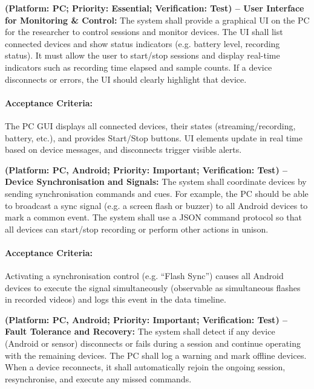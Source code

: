 \begin{description}[style=unboxed,leftmargin=0cm]
	\item[\textbf{FR6}] \textbf{(Platform: PC; Priority: Essential; Verification: Test) – User Interface for Monitoring \& Control:} The system shall provide a graphical UI on the PC for the researcher to control sessions and monitor devices. The UI shall list connected devices and show status indicators (e.g. battery level, recording status). It must allow the user to start/stop sessions and display real-time indicators such as recording time elapsed and sample counts. If a device disconnects or errors, the UI should clearly highlight that device.

	      \paragraph{Acceptance Criteria:} The PC GUI displays all connected devices, their states (streaming/recording, battery, etc.), and provides Start/Stop buttons. UI elements update in real time based on device messages, and disconnects trigger visible alerts.

	\item[\textbf{FR7}] \textbf{(Platform: PC, Android; Priority: Important; Verification: Test) – Device Synchronisation and Signals:} The system shall coordinate devices by sending synchronisation commands and cues. For example, the PC should be able to broadcast a sync signal (e.g. a screen flash or buzzer) to all Android devices to mark a common event. The system shall use a JSON command protocol so that all devices can start/stop recording or perform other actions in unison.

	      \paragraph{Acceptance Criteria:} Activating a synchronisation control (e.g. “Flash Sync”) causes all Android devices to execute the signal simultaneously (observable as simultaneous flashes in recorded videos) and logs this event in the data timeline.

	\item[\textbf{FR8}] \textbf{(Platform: PC, Android; Priority: Important; Verification: Test) – Fault Tolerance and Recovery:} The system shall detect if any device (Android or sensor) disconnects or fails during a session and continue operating with the remaining devices. The PC shall log a warning and mark offline devices. When a device reconnects, it shall automatically rejoin the ongoing session, resynchronise, and execute any missed commands.


\end{description}
